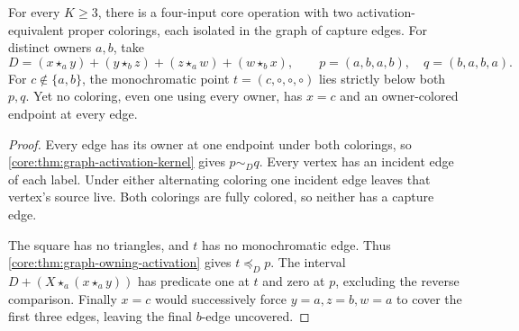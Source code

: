 \begin{proposition}
\label{core:prop:activation-kernel-cycle}
For every $K\geq3$, there is a four-input core operation with two
activation-equivalent proper colorings, each isolated in the graph
of capture edges. For distinct owners $a,b$, take
\[
 D=(x\star_a y)+(y\star_b z)+(z\star_a w)+(w\star_b x),
 \qquad p=(a,b,a,b),\quad q=(b,a,b,a).
\]
For $c\notin\{a,b\}$, the monochromatic point
$t=(c,\circ,\circ,\circ)$ lies strictly below both $p,q$.
Yet no coloring, even one using every owner, has $x=c$ and
an owner-colored endpoint at every edge.
\end{proposition}
\begin{proof}
Every edge has its owner at one endpoint under both colorings, so
\cref{core:thm:graph-activation-kernel} gives $p\sim_Dq$.
Every vertex has an incident edge of each label. Under either
alternating coloring one incident edge leaves that vertex's source
live. Both colorings are fully colored, so neither has a capture edge.

The square has no triangles, and $t$ has no monochromatic edge.
Thus \cref{core:thm:graph-owning-activation} gives
$t\preceq_Dp$.
The interval $D+(X\star_a(x\star_a y))$ has predicate one at
$t$ and zero at $p$, excluding the reverse comparison.
Finally $x=c$ would successively force $y=a,z=b,w=a$ to cover
the first three edges, leaving the final $b$-edge uncovered.
\end{proof}

